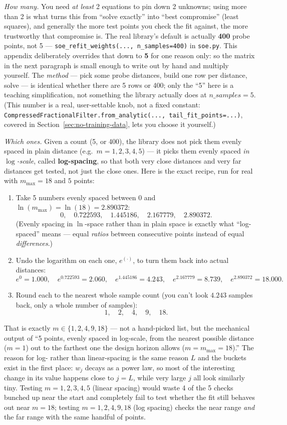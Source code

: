 \documentclass[11pt]{article}
\begin{document}
\emph{How many.} You need \emph{at least} 2 equations to pin down 2 unknowns; using more than 2 is what turns this from ``solve exactly'' into ``best compromise'' (least squares), and generally the more test points you check the fit against, the more trustworthy that compromise is. The real library's default is actually \textbf{400} probe points, not 5 --- \texttt{soe\_refit\_weights(..., n\_samples=400)} in \texttt{soe.py}. This appendix deliberately overrides that down to \textbf{5} for one reason only: so the matrix in the next paragraph is small enough to write out by hand and multiply yourself. The \emph{method} --- pick some probe distances, build one row per distance, solve --- is identical whether there are 5 rows or 400; only the ``5'' here is a teaching simplification, not something the library actually does at $n\_samples=5$. (This number is a real, user-settable knob, not a fixed constant: \texttt{CompressedFractionalFilter.from\_analytic(..., tail\_fit\_points=...)}, covered in Section~\ref{sec:no-training-data}, lets you choose it yourself.)

\emph{Which ones.} Given a count (5, or 400), the library does not pick them evenly spaced in plain distance (e.g.\ $m=1,2,3,4,5$) --- it picks them evenly spaced \emph{in $\log$-scale}, called \textbf{log-spacing}, so that both very close distances and very far distances get tested, not just the close ones. Here is the exact recipe, run for real with $m_{\max}=18$ and $5$ points:
\begin{enumerate}
\item Take 5 numbers evenly spaced between $0$ and $\ln(m_{\max})=\ln(18)=2.890372$:
\[
0,\quad 0.722593,\quad 1.445186,\quad 2.167779,\quad 2.890372.
\]
(Evenly spacing in $\ln$-space rather than in plain space is exactly what ``log-spaced'' means --- equal \emph{ratios} between consecutive points instead of equal \emph{differences}.)
\item Undo the logarithm on each one, $e^{(\cdot)}$, to turn them back into actual distances:
\[
e^{0}=1.000,\quad e^{0.722593}=2.060,\quad e^{1.445186}=4.243,\quad e^{2.167779}=8.739,\quad e^{2.890372}=18.000.
\]
\item Round each to the nearest whole sample count (you can't look $4.243$ samples back, only a whole number of samples):
\[
1,\quad 2,\quad 4,\quad 9,\quad 18.
\]
\end{enumerate}
That is exactly $m\in\{1,2,4,9,18\}$ --- not a hand-picked list, but the mechanical output of ``5 points, evenly spaced in log-scale, from the nearest possible distance ($m=1$) out to the farthest one the design horizon allows ($m=m_{\max}=18$).'' The reason for log- rather than linear-spacing is the same reason $L$ and the buckets exist in the first place: $w_j$ decays as a power law, so most of the interesting change in its value happens close to $j=L$, while very large $j$ all look similarly tiny. Testing $m=1,2,3,4,5$ (linear spacing) would waste 4 of the 5 checks bunched up near the start and completely fail to test whether the fit still behaves out near $m=18$; testing $m=1,2,4,9,18$ (log spacing) checks the near range \emph{and} the far range with the same handful of points.
\end{document}
